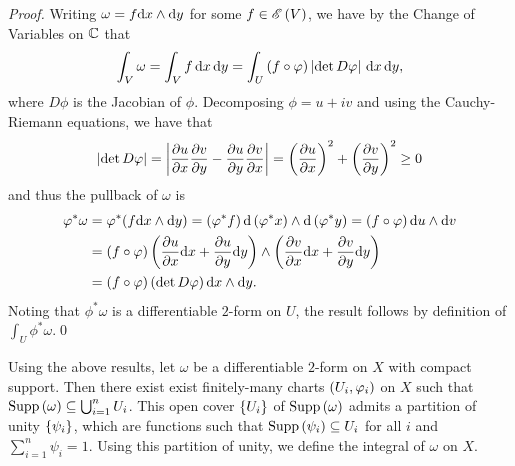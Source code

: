 \documentclass[../Moduli_Spaces_of_Riemann_Surfaces.tex]{subfiles}
\begin{document}
    \begin{proof}
        Writing $\omega=f\mathrm{d} x\wedge\mathrm{d} y$ for some $f\in\mathscr{E}\left(V\right)$, we have by the Change of Variables on $\mathbb{C}$ that
        \begin{equation*}
            \int_V\omega=\int_Vf\,\mathrm{d} x\,\mathrm{d} y=\int_U\left(f\circ\varphi\right)\left|\det D\varphi\right|\,\mathrm{d} x\,\mathrm{d} y,
        \end{equation*}
        where $D\phi$ is the Jacobian of $\phi$. Decomposing $\phi=u+iv$ and using the Cauchy-Riemann equations, we have that
        \begin{equation*}
            \left|\det D\varphi\right|=\left|\frac{\partial u}{\partial x}\frac{\partial v}{\partial y}-\frac{\partial u}{\partial y}\frac{\partial v}{\partial x}\right|=\left(\frac{\partial u}{\partial x}\right)^2+\left(\frac{\partial v}{\partial y}\right)^2\geq0
        \end{equation*}
        and thus the pullback of $\omega$ is
        \begin{equation*}
            \begin{aligned}
                \varphi^\ast\omega&=\varphi^\ast\!\left(f\mathrm{d} x\wedge\mathrm{d} y\right)=\left(\varphi^\ast f\right)\mathrm{d}\left(\varphi^\ast x\right)\wedge\mathrm{d}\left(\varphi^\ast y\right)=\left(f\circ\varphi\right)\mathrm{d} u\wedge \mathrm{d} v \\
                               &=\left(f\circ\varphi\right)\left(\frac{\partial u}{\partial x}\mathrm{d} x+\frac{\partial u}{\partial y}\mathrm{d} y\right)\wedge\left(\frac{\partial v}{\partial x}\mathrm{d} x+\frac{\partial v}{\partial y}\mathrm{d} y\right) \\
                               &=\left(f\circ\varphi\right)\left(\det D\varphi\right)\mathrm{d} x\wedge\mathrm{d} y.
            \end{aligned}
        \end{equation*}
        Noting that $\phi^\ast\omega$ is a differentiable $2$-form on $U$, the result follows by definition of $\int_U\phi^\ast\omega$.\qed
    \end{proof}
    Using the above results, let $\omega$ be a differentiable $2$-form on $X$ with compact support. Then there exist exist finitely-many charts $\left(U_i,\varphi_i\right)$ on $X$ such that $\operatorname{Supp}\left(\omega\right)\subseteq\bigcup_{i=1}^{n}U_i$. This open cover $\left\{U_i\right\}$ of $\operatorname{Supp}\left(\omega\right)$ admits a partition of unity $\left\{\psi_i\right\}$, which are functions such that $\operatorname{Supp}\left(\psi_i\right)\subseteq U_i$ for all $i$ and $\sum_{i=1}^n\psi_i=1$. Using this partition of unity, we define the integral of $\omega$ on $X$.
\end{document}
